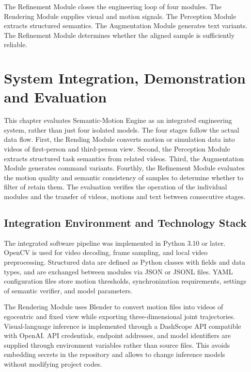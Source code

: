 \documentclass[11pt,oneside]{report}
\begin{document}
The Refinement Module closes the engineering loop of four modules. The Rendering Module supplies visual and motion signals. The Perception Module extracts structured semantics. The Augmentation Module generates text variants. The Refinement Module determines whether the aligned sample is sufficiently reliable.


\chapter{System Integration, Demonstration and Evaluation}

This chapter evaluates Semantic-Motion Engine as an integrated engineering system, rather than just four isolated models. The four stages follow the actual data flow. First, the Rending Module converts motion or simulation data into videos of first-person and third-person view. Second, the Perception Module extracts structured task semantics from related videos. Third, the Augmentation Module generates command variants. Fourthly, the Refinement Module evaluates the motion quality and semantic consistency of samples to determine whether to filter of retain them. The evaluation verifies the operation of the individual modules and the transfer of videos, motions and text between consecutive stages.

\section{Integration Environment and Technology Stack}

The integrated software pipeline was implemented in Python 3.10 or later. OpenCV is used for video decoding, frame sampling, and local video preprocessing. Structured data are defined as Python classes with fields and data types, and are exchanged between modules via JSON or JSONL files. YAML configuration files store motion thresholds, synchronization requirements, settings of semantic verifier, and model parameters. 

The Rendering Module uses Blender to convert motion files into videos of egocentric and fixed view while exporting three-dimensional joint trajectories. Visual-language inference is implemented through a DashScope API compatible with OpenAI. API credentials, endpoint addresses, and model identifiers are supplied through environment variables rather than source files. This avoids embedding secrets in the repository and allows to change inference models without modifying project codes.
\end{document}
